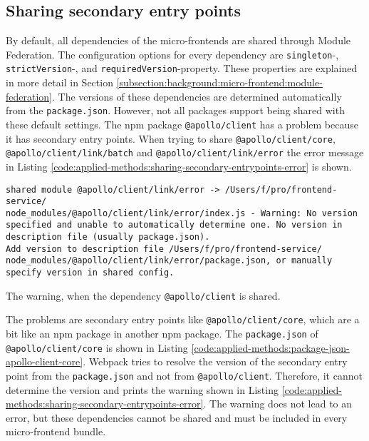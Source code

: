 \subsection{Sharing secondary entry points}\label{subsection:applied-methods:prototypical-implementation:sharing
-secondary-entrypoints}

By default, all dependencies of the micro-frontends are shared through Module Federation. The configuration options for every dependency are \texttt{singleton}-, \texttt{strictVersion}-, and \texttt{requiredVersion}-property. These properties are explained in more detail in Section \ref{subsection:background:micro-frontend:module-federation}. The versions of these dependencies are determined automatically from the \texttt{package.json}. However, not all packages support being shared with these default settings. The npm package \texttt{@apollo/client} has a problem because it has secondary entry points. When trying to share \texttt{@apollo/client/core}, \texttt{@apollo/client/link/batch} and \texttt{@apollo/client/link/error} the error message in Listing \ref{code:applied-methods:sharing-secondary-entrypoints-error} is shown.

\ifshowListings
\begin{listing}[H]
    \begin{verbatim}
shared module @apollo/client/link/error -> /Users/f/pro/frontend-service/
node_modules/@apollo/client/link/error/index.js - Warning: No version 
specified and unable to automatically determine one. No version in 
description file (usually package.json).
Add version to description file /Users/f/pro/frontend-service/
node_modules/@apollo/client/link/error/package.json, or manually 
specify version in shared config.
    \end{verbatim}
    \caption{The warning, when the dependency \texttt{@apollo/client} is shared.}\label{code:applied-methods:sharing-secondary-entrypoints-error}
\end{listing}
\fi


\noindent The problems are secondary entry points like \texttt{@apollo/client/core}, which are a bit like an npm package in another npm package. The \texttt{package.json} of \texttt{@apollo/client/core} is shown in Listing \ref{code:applied-methods:package-json-apollo-client-core}. Webpack tries to resolve the version of the secondary entry point from the \texttt{package.json} and not from \texttt{@apollo/client}. Therefore, it cannot determine the version and prints the warning shown in Listing \ref{code:applied-methods:sharing-secondary-entrypoints-error}. The warning does not lead to an error, but these dependencies cannot be shared and must be included in every micro-frontend bundle.

